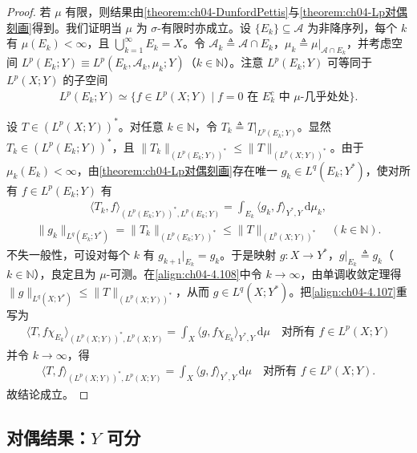 \documentclass[../../main.tex]{subfiles}%
\begin{document}
\begin{proof}
若 $\mu$ 有限，则结果由\cref{theorem:ch04-DunfordPettis}与\cref{theorem:ch04-Lp对偶刻画}得到。我们证明当 $\mu$ 为 $\sigma$-有限时亦成立。设 $\{E_k\}\subseteq\mathcal{A}$ 为非降序列，每个 $k$ 有 $\mu(E_k)<\infty$，且 $\bigcup_{k=1}^\infty E_k=X$。令 $\mathcal{A}_k\triangleq \mathcal{A}\cap E_k$，$\mu_k\triangleq \mu|_{\mathcal{A}\cap E_k}$，并考虑空间 $L^p(E_k;Y)\equiv L^p(E_k,\mathcal{A}_k,\mu_k;Y)$（$k\in\mathbb{N}$）。注意 $L^p(E_k;Y)$ 可等同于 $L^p(X;Y)$ 的子空间
\begin{align*}
L^p(E_k;Y)\simeq\{f\in L^p(X;Y)\mid f=0\text{ 在 }E_k^c\text{ 中 }\mu\text{-几乎处处}\}.
\end{align*}

设 $T\in(L^p(X;Y))^*$。对任意 $k\in\mathbb{N}$，令 $T_k\triangleq T|_{L^p(E_k;Y)}$。显然 $T_k\in(L^p(E_k;Y))^*$，且 $\|T_k\|_{(L^p(E_k;Y))^*}\leqslant\|T\|_{(L^p(X;Y))^*}$。由于 $\mu_k(E_k)<\infty$，由\cref{theorem:ch04-Lp对偶刻画}存在唯一 $g_k\in L^q(E_k;Y^*)$，使对所有 $f\in L^p(E_k;Y)$ 有
\begin{align}
\langle T_k,f\rangle_{(L^p(E_k;Y))^*,L^p(E_k;Y)}=\int_{E_k}\langle g_k,f\rangle_{Y^*,Y}\,\mathrm{d}\mu_k, \label{align:ch04-4.107}
\end{align}
\begin{align}
\|g_k\|_{L^q(E_k;Y^*)}=\|T_k\|_{(L^p(E_k;Y))^*}\leqslant\|T\|_{(L^p(X;Y))^*}\quad(k\in\mathbb{N}). \label{align:ch04-4.108}
\end{align}
不失一般性，可设对每个 $k$ 有 $g_{k+1}|_{E_k}=g_k$。于是映射 $g:X\to Y^*$，$g|_{E_k}\triangleq g_k$（$k\in\mathbb{N}$），良定且为 $\mu$-可测。在\eqref{align:ch04-4.108}中令 $k\to\infty$，由单调收敛定理得 $\|g\|_{L^q(X;Y^*)}\leqslant\|T\|_{(L^p(X;Y))^*}$，从而 $g\in L^q(X;Y^*)$。把\eqref{align:ch04-4.107}重写为
\begin{align*}
\langle T,f\chi_{E_k}\rangle_{(L^p(X;Y))^*,L^p(X;Y)}=\int_X\langle g,f\chi_{E_k}\rangle_{Y^*,Y}\,\mathrm{d}\mu\quad\text{对所有 }f\in L^p(X;Y)
\end{align*}
并令 $k\to\infty$，得
\begin{align*}
\langle T,f\rangle_{(L^p(X;Y))^*,L^p(X;Y)}=\int_X\langle g,f\rangle_{Y^*,Y}\,\mathrm{d}\mu\quad\text{对所有 }f\in L^p(X;Y).
\end{align*}
故结论成立。
\end{proof}

\subsection{对偶结果：$Y$ 可分}\label{subsection:ch04-可分Y对偶}
\end{document}
